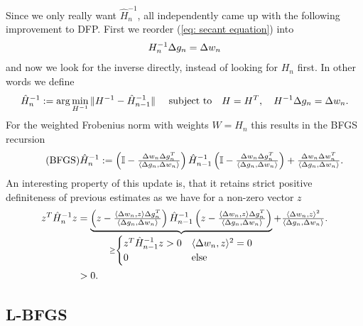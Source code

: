 Since we only really want \(\hat{H}_n^{-1}\),
\textcite{broydenConvergenceClassDoublerank1970,fletcherNewApproachVariable1970,goldfarbFamilyVariablemetricMethods1970,shannoConditioningQuasiNewtonMethods1970}
all independently came up with the following improvement to DFP. First we
reorder (\ref{eq: secant equation}) into
\begin{align*}
	H_n^{-1} \Delta g_n = \Delta w_n
\end{align*}
and now we look for the inverse directly, instead of looking for \(H_n\) first.
In other words we define
\begin{align*}
	\hat{H}_n^{-1} &:= \arg\min_{H^{-1}} \| H^{-1} - \hat{H}_{n-1}^{-1}\|
	& \text{ subject to}\quad H=H^T,\quad H^{-1}\Delta g_n =\Delta w_n.
\end{align*}
For the weighted Frobenius norm with weights \(W=H_n\) this results in the BFGS
recursion
\begin{align}
	\tag{BFGS}
	\hat{H}_n^{-1} :=
	\left(\mathbb{I}-\tfrac{\Delta w_n \Delta g_n^T}{\langle \Delta g_n, \Delta w_n\rangle}\right)
	\hat{H}_{n-1}^{-1}
	\left(\mathbb{I}-\tfrac{ \Delta w_n\Delta g_n^T}{\langle \Delta g_n, \Delta w_n\rangle}\right)
	+ \tfrac{\Delta w_n \Delta w_n^T}{\langle \Delta g_n, \Delta w_n\rangle}.
\end{align}
An interesting property of this update is, that it retains strict positive
definiteness of previous estimates as we have for a non-zero vector \(z\)
\begin{align*}
	z^T \hat{H}_n^{-1} z
	&= \underbrace{
		\left(z-\tfrac{
			\langle\Delta w_n, z\rangle \Delta g_n^T
		}{
			\langle \Delta g_n, \Delta w_n\rangle
		}\right)
		\hat{H}_{n-1}^{-1}
		\left(z-\tfrac{\langle \Delta w_n, z\rangle \Delta g_n^T}{\langle \Delta g_n, \Delta w_n\rangle}\right)
	}_{
	\ge \begin{cases}
		z^T \hat{H}_{n-1}^{-1} z > 0 & \langle\Delta w_n, z\rangle^2 =0 \\
		0 & \text{else}
	\end{cases}
	}
	+ \tfrac{\langle\Delta w_n, z\rangle^2}{\langle \Delta g_n, \Delta w_n\rangle}.
	\\
	&> 0.
\end{align*}

\subsection{L-BFGS}

